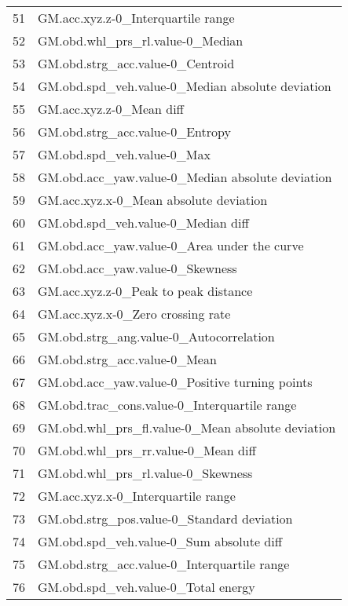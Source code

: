 \begin{tabular}{ll}
51  &                 GM.acc.xyz.z-0\_Interquartile range \\
52  &                   GM.obd.whl\_prs\_rl.value-0\_Median \\
53  &                   GM.obd.strg\_acc.value-0\_Centroid \\
54  &   GM.obd.spd\_veh.value-0\_Median absolute deviation \\
55  &                           GM.acc.xyz.z-0\_Mean diff \\
56  &                    GM.obd.strg\_acc.value-0\_Entropy \\
57  &                         GM.obd.spd\_veh.value-0\_Max \\
58  &   GM.obd.acc\_yaw.value-0\_Median absolute deviation \\
59  &             GM.acc.xyz.x-0\_Mean absolute deviation \\
60  &                 GM.obd.spd\_veh.value-0\_Median diff \\
61  &        GM.obd.acc\_yaw.value-0\_Area under the curve \\
62  &                    GM.obd.acc\_yaw.value-0\_Skewness \\
63  &               GM.acc.xyz.z-0\_Peak to peak distance \\
64  &                  GM.acc.xyz.x-0\_Zero crossing rate \\
65  &            GM.obd.strg\_ang.value-0\_Autocorrelation \\
66  &                       GM.obd.strg\_acc.value-0\_Mean \\
67  &     GM.obd.acc\_yaw.value-0\_Positive turning points \\
68  &       GM.obd.trac\_cons.value-0\_Interquartile range \\
69  &  GM.obd.whl\_prs\_fl.value-0\_Mean absolute deviation \\
70  &                GM.obd.whl\_prs\_rr.value-0\_Mean diff \\
71  &                 GM.obd.whl\_prs\_rl.value-0\_Skewness \\
72  &                 GM.acc.xyz.x-0\_Interquartile range \\
73  &         GM.obd.strg\_pos.value-0\_Standard deviation \\
74  &           GM.obd.spd\_veh.value-0\_Sum absolute diff \\
75  &        GM.obd.strg\_acc.value-0\_Interquartile range \\
76  &                GM.obd.spd\_veh.value-0\_Total energy \\

\end{tabular}
